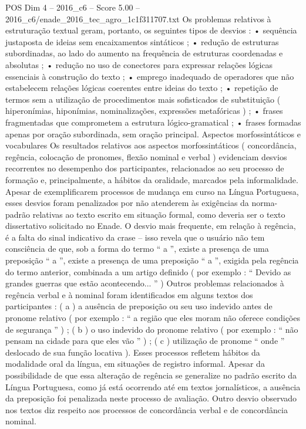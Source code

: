 \begin{textsample}{POS Dim 4 – 2016\_c6 – Score 5.00 – 2016\_c6/enade\_2016\_tec\_agro\_1c1f311707.txt}
Os problemas relativos à estruturação textual geram, portanto, os seguintes tipos de desvios : • sequência justaposta de ideias sem encaixamentos sintáticos ; • redução de estruturas subordinadas, ao lado do aumento na frequência de estruturas coordenadas e absolutas ; • redução no uso de conectores para expressar relações lógicas essenciais à construção do texto ; • emprego inadequado de operadores que não estabelecem relações lógicas coerentes entre ideias do texto ; • repetição de termos sem a utilização de procedimentos mais sofisticados de substituição ( hiperonímias, hiponímias, nominalizações, expressões metafóricas ) ; • frases fragmentadas que comprometem a estrutura lógico-gramatical ; • frases formadas apenas por oração subordinada, sem oração principal.
Aspectos morfossintáticos e vocabulares Os resultados relativos aos aspectos morfossintáticos ( concordância, regência, colocação de pronomes, flexão nominal e verbal ) evidenciam desvios recorrentes no desempenho dos participantes, relacionados ao seu processo de formação e, principalmente, a hábitos da oralidade, marcados pela informalidade.
Apesar de exemplificarem processos de mudança em curso na Língua Portuguesa, esses desvios foram penalizados por não atenderem às exigências da norma-padrão relativas ao texto escrito em situação formal, como deveria ser o texto dissertativo solicitado no Enade.
O desvio mais frequente, em relação à regência, é a falta do sinal indicativo da crase – isso revela que o usuário não tem consciência de que, sob a forma do termo “ a ”, existe a presença de uma preposição “ a ”, existe a presença de uma preposição “ a ”, exigida pela regência do termo anterior, combinada a um artigo definido ( por exemplo : “ Devido as grandes guerras que estão acontecendo... ” ) Outros problemas relacionados à regência verbal e à nominal foram identificados em alguns textos dos participantes : ( a ) a ausência de preposição ou seu uso indevido antes de pronome relativo ( por exemplo : “ a região que eles moram não oferece condições de segurança ” ) ; ( b ) o uso indevido do pronome relativo ( por exemplo : “ não pensam na cidade para que eles vão ” ) ; ( c ) utilização de pronome “ onde ” deslocado de sua função locativa ).
Esses processos refletem hábitos da modalidade oral da língua, em situações de registro informal.
Apesar da possibilidade de que essa alteração de regência se generalize no padrão escrito da Língua Portuguesa, como já está ocorrendo até em textos jornalísticos, a ausência da preposição foi penalizada neste processo de avaliação.
Outro desvio observado nos textos diz respeito aos processos de concordância verbal e de concordância nominal.

\end{textsample}
